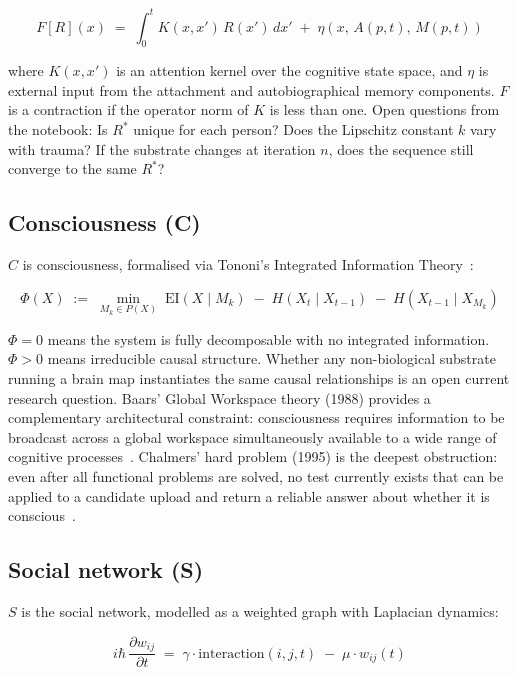 \documentclass[12pt, a4paper]{article}
\begin{document}
\begin{equation}
F[R](x) \;=\; \int_0^t K(x,x')\,R(x')\,dx' \;+\; \eta(x,\,A(p,t),\,M(p,t))
\end{equation}

where $K(x,x')$ is an attention kernel over the cognitive state space, and $\eta$ is external input
from the attachment and autobiographical memory components. $F$ is a contraction if the operator norm
of $K$ is less than one. Open questions from the notebook: Is $R^*$ unique for each person? Does the
Lipschitz constant $k$ vary with trauma? If the substrate changes at iteration $n$, does the sequence
still converge to the same $R^*$?

\subsection*{Consciousness (C)}

$C$ is consciousness, formalised via Tononi's Integrated Information Theory~\cite{Alg-8}:

\begin{equation}
\Phi(X) \;:=\; \min_{M_k \in P(X)}\; \mathrm{EI}(X \mid M_k)
           \;-\; H(X_t \mid X_{t-1})
           \;-\; H(X_{t-1} \mid X_{M_k})
\end{equation}

$\Phi = 0$ means the system is fully decomposable with no integrated information. $\Phi > 0$ means
irreducible causal structure. Whether any non-biological substrate running a brain map instantiates
the same causal relationships is an open current research question. Baars' Global Workspace theory
(1988) provides a complementary architectural constraint: consciousness requires information to be
broadcast across a global workspace simultaneously available to a wide range of cognitive
processes~\cite{Alg-9}. Chalmers' hard problem (1995) is the deepest obstruction: even after all
functional problems are solved, no test currently exists that can be applied to a candidate upload and
return a reliable answer about whether it is conscious~\cite{Alg-7}.

\subsection*{Social network (S)}

$S$ is the social network, modelled as a weighted graph with Laplacian dynamics:

\begin{equation}
i\hbar\,\frac{\partial w_{ij}}{\partial t}
    \;=\; \gamma \cdot \mathrm{interaction}(i,j,t) \;-\; \mu \cdot w_{ij}(t)
\end{equation}
\end{document}
